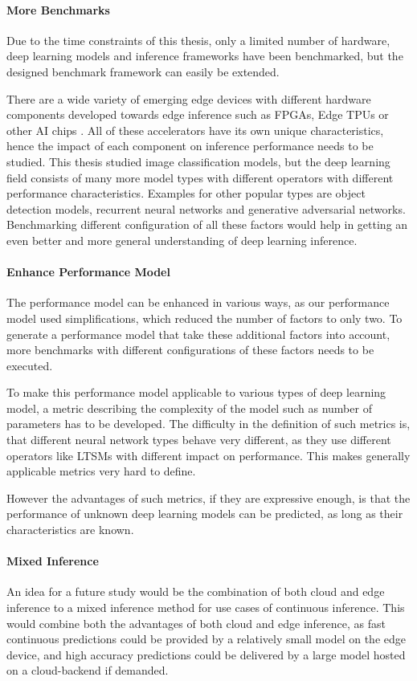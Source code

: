 \paragraph{More Benchmarks}
Due to the time constraints of this thesis, only a limited number of hardware, deep learning models and inference frameworks have been benchmarked, but the designed benchmark framework can easily be extended.


There are a wide variety of emerging edge devices with different hardware components developed towards edge inference such as FPGAs, Edge TPUs or other AI chips \cite{AItrends}.
All of these accelerators have its own unique characteristics, hence the impact of each component on inference performance needs to be studied.
This thesis studied image classification models, but the deep learning field consists of many more model types with different operators with different performance characteristics.
Examples for other popular types are object detection models, recurrent neural networks and generative adversarial networks.
Benchmarking different configuration of all these factors would help in getting an even better and more general understanding of deep learning inference.


\paragraph{Enhance Performance Model}
The performance model can be enhanced in various ways, as our performance model used simplifications, which reduced the number of factors to only two.
To generate a performance model that take these additional factors into account, more benchmarks with different configurations of these factors needs to be executed.

To make this performance model applicable to various types of deep learning model, a metric describing the complexity of the model such as number of parameters has to be developed.
The difficulty in the definition of such metrics is, that different neural network types behave very different, as they use different operators like LTSMs with different impact on performance. 
This makes generally applicable metrics very hard to define.

However the advantages of such metrics, if they are expressive enough, is that the performance of unknown deep learning models can be predicted, as long as their characteristics are known.
\paragraph{Mixed Inference}
An idea for a future study would be the combination of both cloud and edge inference to a mixed inference method for use cases of continuous inference.
This would combine both the advantages of both cloud and edge inference, as fast continuous predictions could be provided by a relatively small model on the edge device, and high accuracy predictions could be delivered by a large model hosted on a cloud-backend if demanded. 

